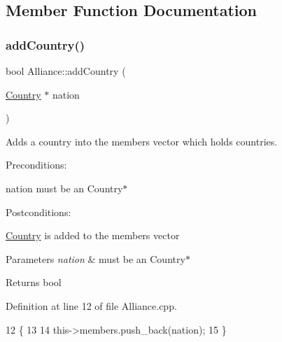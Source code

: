 \subsection{Member Function Documentation}
\mbox{\label{classAlliance_a7e5d92ca269e0d21b80978b0f72a2230}} 
\subsubsection{\texorpdfstring{add\+Country()}{addCountry()}}
{\footnotesize\ttfamily bool Alliance\+::add\+Country (\begin{DoxyParamCaption}\item[{\hyperlink{classCountry}{Country} $\ast$}]{nation }\end{DoxyParamCaption})}



Adds a country into the members vector which holds countries. 

Preconditions\+:
\begin{DoxyItemize}
\item nation must be an Country$\ast$
\end{DoxyItemize}

Postconditions\+:
\begin{DoxyItemize}
\item \hyperlink{classCountry}{Country} is added to the members vector
\end{DoxyItemize}


\begin{DoxyParams}{Parameters}
{\em nation} & must be an Country$\ast$ \\
\hline
\end{DoxyParams}
\begin{DoxyReturn}{Returns}
bool 
\end{DoxyReturn}


Definition at line 12 of file Alliance.\+cpp.


\begin{DoxyCode}
12                                          \{
13 
14     this->members.push\_back(nation);
15 \}
\end{DoxyCode}
\mbox{\label{classAlliance_ab1ba99d78866c13e17031afa3bdd727e}} 
